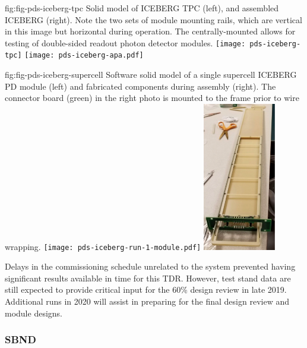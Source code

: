 \begin{dunefigure}
 {fig:fig-pds-iceberg-tpc}
 {Solid model of ICEBERG TPC (left), and assembled ICEBERG  (right).  Note the two sets of  module mounting rails, which are vertical in this image but horizontal during operation. The centrally-mounted  allows for testing of double-sided readout photon detector modules.}
\texttt{[image: pds-iceberg-tpc]}
\texttt{[image: pds-iceberg-apa.pdf]}
\end{dunefigure}

\begin{dunefigure}
 {fig:fig-pds-iceberg-supercell}
 {Software solid model of a single supercell ICEBERG PD module (left) and fabricated components during assembly (right).  The connector board (green) in the right photo is mounted to the  frame prior to wire wrapping.}
\texttt{[image: pds-iceberg-run-1-module.pdf]}
\includegraphics[angle=0,height=6.5cm]{graphics/pds-iceberg-module-assembly-photo.pdf}
\end{dunefigure}

Delays in the  commissioning schedule unrelated to the  system prevented having significant results available in time for this TDR. However, test stand data are still expected to provide critical input for the 60\% design review in late 2019. Additional runs in 2020 will assist in preparing for the final design review and  module designs.


\subsubsection{SBND}
\label{sec:valid-sbnd}


